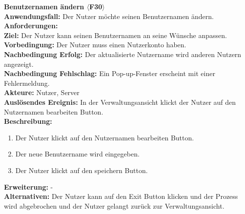 \documentclass[parskip=full]{scrartcl}
\begin{document}
\textbf{Benutzernamen ändern $\langle$F30$\rangle$}\\
\textbf{Anwendungsfall:} Der Nutzer möchte seinen Benutzernamen ändern.\\
\textbf{Anforderungen:} \\
\textbf{Ziel:} Der Nutzer kann seinen Benutzernamen an seine Wünsche anpassen.\\
\textbf{Vorbedingung:} Der Nutzer muss einen Nutzerkonto haben.\\
\textbf{Nachbedingung Erfolg:} Der aktualisierte Nutzername wird anderen Nutzern angezeigt.\\
\textbf{Nachbedingung Fehlschlag:} Ein Pop-up-Fenster erscheint mit einer Fehlermeldung.\\
\textbf{Akteure:} Nutzer, Server\\
\textbf{Auslösendes Ereignis:} In der Verwaltungsansicht klickt der Nutzer auf den Nutzernamen bearbeiten Button.\\
\textbf{Beschreibung:}
\begin{enumerate}
    \item Der Nutzer klickt auf den Nutzernamen bearbeiten Button.
    \item Der neue Benutzername wird eingegeben.
    \item Der Nutzer klickt auf den speichern Button.
\end{enumerate}
\textbf{Erweiterung:} -\\
\textbf{Alternativen:} Der Nutzer kann auf den Exit Button klicken und der Prozess wird abgebrochen und der Nutzer gelangt zurück zur Verwaltungsansicht.\\
\newpage
\end{document}
